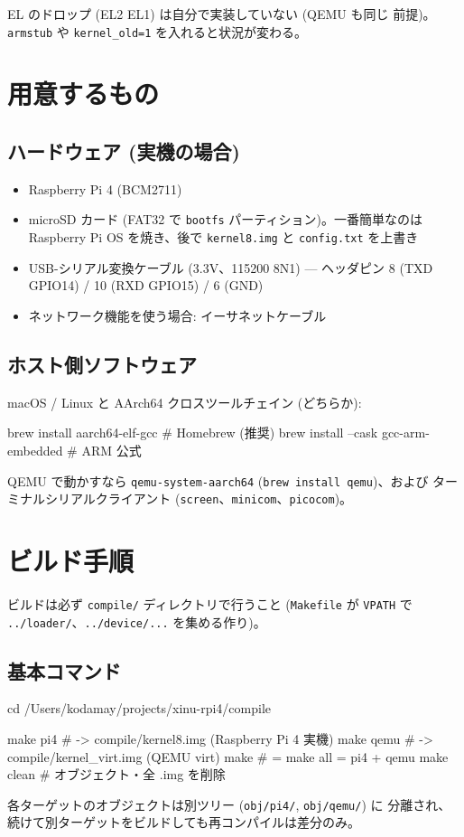 \documentclass[a4paper,11pt]{ltjsarticle}
\begin{document}
EL のドロップ (EL2\,\textrightarrow\,EL1) は自分で実装していない (QEMU も同じ
前提)。\verb|armstub| や \verb|kernel_old=1| を入れると状況が変わる。

\section{用意するもの}

\subsection{ハードウェア (実機の場合)}
\begin{itemize}[leftmargin=1.4em,itemsep=1pt]
\item Raspberry Pi 4 (BCM2711)
\item microSD カード (FAT32 で \verb|bootfs| パーティション)。一番簡単なのは
  Raspberry Pi OS を焼き、後で \verb|kernel8.img| と \verb|config.txt| を上書き
\item USB-シリアル変換ケーブル (3.3V、115200 8N1) --- ヘッダピン 8
  (TXD\,\textrightarrow\,GPIO14) / 10 (RXD\,\textrightarrow\,GPIO15) / 6 (GND)
\item ネットワーク機能を使う場合: イーサネットケーブル
\end{itemize}

\subsection{ホスト側ソフトウェア}
macOS / Linux と AArch64 クロスツールチェイン (どちらか):
\begin{code}
brew install aarch64-elf-gcc           # Homebrew (推奨)
brew install --cask gcc-arm-embedded   # ARM 公式
\end{code}
QEMU で動かすなら \verb|qemu-system-aarch64| (\verb|brew install qemu|)、および
ターミナルシリアルクライアント (\verb|screen|、\verb|minicom|、\verb|picocom|)。

\section{ビルド手順}

ビルドは必ず \verb|compile/| ディレクトリで行うこと (\verb|Makefile| が
\verb|VPATH| で \verb|../loader/|、\verb|../device/...| を集める作り)。

\subsection{基本コマンド}
\begin{code}
cd /Users/kodamay/projects/xinu-rpi4/compile

make pi4            # -> compile/kernel8.img      (Raspberry Pi 4 実機)
make qemu           # -> compile/kernel_virt.img  (QEMU virt)
make                # = make all = pi4 + qemu
make clean          # オブジェクト・全 .img を削除
\end{code}
各ターゲットのオブジェクトは別ツリー (\verb|obj/pi4/|, \verb|obj/qemu/|) に
分離され、続けて別ターゲットをビルドしても再コンパイルは差分のみ。
\end{document}
